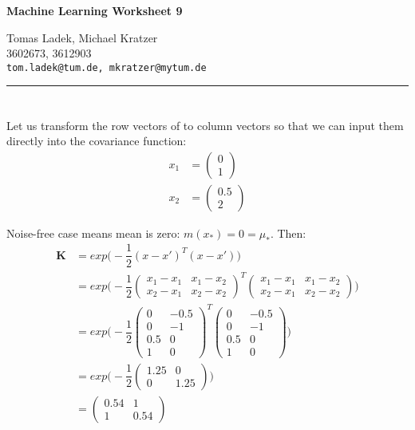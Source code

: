 \documentclass[11pt]{article}
\makeatletter
\newcommand{\exercise}{\section{}}
\newcommand{\hwhead}[4]{
\begin{center}
\sffamily\large\bfseries Machine Learning Worksheet #1
\vspace{2mm}
\normalfont

#2\\
#3\\
\texttt{#4}
\end{center}
\vspace{6mm} \hrule \vspace{4mm}
}
\newcommand{\names}{Tomas Ladek, Michael Kratzer} %
\newcommand{\imats}{3602673, 3612903} %
\newcommand{\emails}{tom.ladek@tum.de, mkratzer@mytum.de} %
\makeatother
\begin{document}
\hwhead{9}{\names}{\imats}{\emails}


\exercise
Let us transform the row vectors of  to column vectors so that we can input them directly into the covariance function:
\begin{align*}
	x_1 &= 
	\begin{pmatrix}
	0 \\
	1
	\end{pmatrix}\\
	x_2 &=
	\begin{pmatrix}
	0.5 \\
	2
	\end{pmatrix}
\end{align*}


\noindent Noise-free case means mean is zero: $m(x_*) = 0 = \mu_*$. Then:
\begin{align*}
	\boldsymbol{K} &= exp\big(-\dfrac{1}{2}(x - x')^T (x - x')\big)\\	
	  &= exp\big(-\dfrac{1}{2}
	  \begin{pmatrix}
		  x_1 - x_1 & x_1 - x_2 \\
		  x_2 - x_1 & x_2 - x_2
	  \end{pmatrix}^T 
	  \begin{pmatrix}
		  x_1 - x_1 & x_1 - x_2 \\
		  x_2 - x_1 & x_2 - x_2
	  \end{pmatrix}
	  \big)\\	  
	  &= exp\big(-\dfrac{1}{2}
	  \begin{pmatrix}
		  0 & -0.5 \\
		  0 & -1 \\
		  0.5 & 0 \\
		  1 & 0
	  \end{pmatrix}^T 
	  \begin{pmatrix}
		  0 & -0.5 \\
		  0 & -1 \\
		  0.5 & 0 \\
		  1 & 0
	  \end{pmatrix}
	  \big)\\	  
	  &= exp\big(-\dfrac{1}{2}
	  \begin{pmatrix}
		  1.25 & 0 \\
		  0 & 1.25
	  \end{pmatrix}
	  \big)\\	  
	  &=
	  \begin{pmatrix}
		  0.54 & 1 \\
		  1 & 0.54		  
	  \end{pmatrix}
\end{align*}
\end{document}
